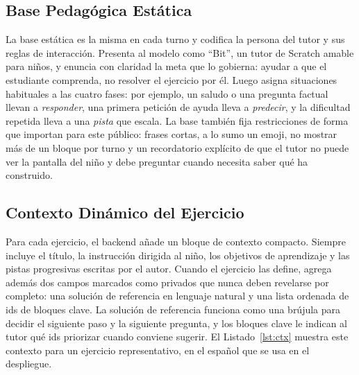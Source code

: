 \documentclass[conference]{IEEEtran}
\begin{document}
\subsection{Base Pedagógica Estática}

La base estática es la misma en cada turno y codifica la persona del tutor y sus reglas de interacción. Presenta al modelo como ``Bit'', un tutor de Scratch amable para niños, y enuncia con claridad la meta que lo gobierna: ayudar a que el estudiante comprenda, no resolver el ejercicio por él. Luego asigna situaciones habituales a las cuatro fases: por ejemplo, un saludo o una pregunta factual llevan a \emph{responder}, una primera petición de ayuda lleva a \emph{predecir}, y la dificultad repetida lleva a una \emph{pista} que escala. La base también fija restricciones de forma que importan para este público: frases cortas, a lo sumo un emoji, no mostrar más de un bloque por turno y un recordatorio explícito de que el tutor no puede ver la pantalla del niño y debe preguntar cuando necesita saber qué ha construido.

\subsection{Contexto Dinámico del Ejercicio}

Para cada ejercicio, el backend añade un bloque de contexto compacto. Siempre incluye el título, la instrucción dirigida al niño, los objetivos de aprendizaje y las pistas progresivas escritas por el autor. Cuando el ejercicio las define, agrega además dos campos marcados como privados que nunca deben revelarse por completo: una solución de referencia en lenguaje natural y una lista ordenada de ids de bloques clave. La solución de referencia funciona como una brújula para decidir el siguiente paso y la siguiente pregunta, y los bloques clave le indican al tutor qué ids priorizar cuando conviene sugerir. El Listado~\ref{lst:ctx} muestra este contexto para un ejercicio representativo, en el español que se usa en el despliegue.
\end{document}
